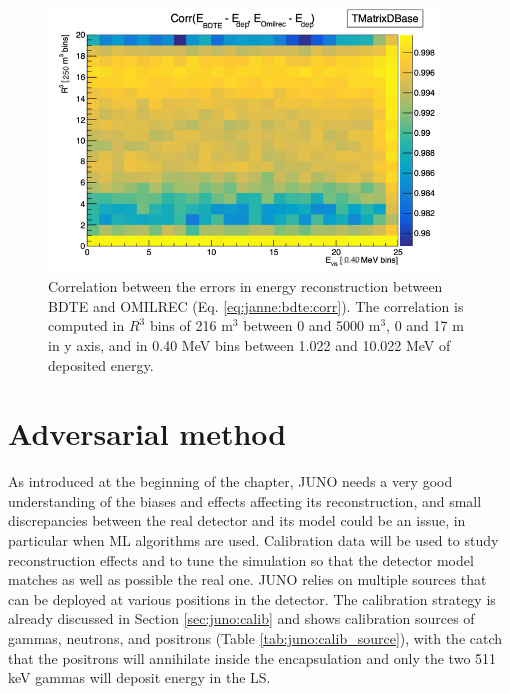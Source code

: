 \documentclass[../main.tex]{subfiles}
\begin{document}
\begin{figure}
  \centering
  \includegraphics[height=7cm]{images/janne/bdte/corr_bdte_omilrec.png}
  \caption{Correlation between the errors in energy reconstruction between BDTE and OMILREC (Eq. \ref{eq:janne:bdte:corr}). The correlation is computed in $R^3$ bins of 216 m$^3$ between 0 and 5000 m$^3$, 0 and 17 m in y axis, and in 0.40 MeV bins between 1.022 and 10.022 MeV of deposited energy.}
  \label{fig:janne:bdte:corr}
\end{figure}



\section{Adversarial method}
\label{sec:janne:method}

As introduced at the beginning of the chapter, JUNO needs a very good understanding of the biases and effects affecting its reconstruction, and small discrepancies between the real detector and its model could be an issue, in particular when ML algorithms are used. Calibration data will be used to study reconstruction effects and to tune the simulation so that the detector model matches as well as possible the real one. JUNO relies on multiple sources that can be deployed at various positions in the detector. The calibration strategy is already discussed in Section \ref{sec:juno:calib} and shows calibration sources of gammas, neutrons, and positrons (Table \ref{tab:juno:calib_source}), with the catch that the positrons will annihilate inside the encapsulation and only the two 511 keV gammas will deposit energy in the LS.
\end{document}
